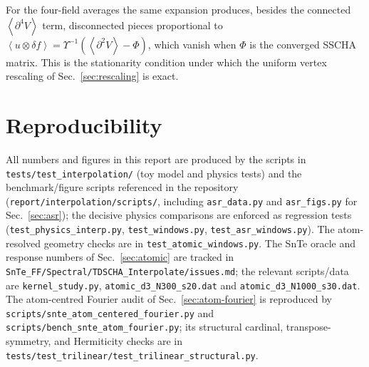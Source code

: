 \documentclass[11pt,a4paper]{article}
\newcommand{\avg}[1]{\left\langle #1 \right\rangle}
\begin{document}
For the four-field averages the same expansion produces, besides the
connected $\avg{\partial^4 V}$ term, disconnected pieces proportional to
$\avg{u \otimes \delta f} = \Upsilon^{-1}(\avg{\partial^2 V} - \Phi)$,
which vanish when $\Phi$ is the converged SSCHA matrix. This is the
stationarity condition under which the uniform vertex rescaling of
Sec.~\ref{sec:rescaling} is exact.

\section{Reproducibility}
All numbers and figures in this report are produced by the scripts in
\texttt{tests/test\_interpolation/} (toy model and physics tests) and the
benchmark/figure scripts referenced in the repository
(\texttt{report/interpolation/scripts/}, including \texttt{asr\_data.py}
and \texttt{asr\_figs.py} for Sec.~\ref{sec:asr}); the decisive physics
comparisons are enforced as regression tests
(\texttt{test\_physics\_interp.py}, \texttt{test\_windows.py},
\texttt{test\_asr\_windows.py}).  The atom-resolved geometry checks are in
\texttt{test\_atomic\_windows.py}.  The SnTe oracle and response numbers of
Sec.~\ref{sec:atomic} are tracked in
\texttt{SnTe\_FF/Spectral/TDSCHA\_Interpolate/issues.md}; the relevant
scripts/data are \texttt{kernel\_study.py},
\texttt{atomic\_d3\_N300\_s20.dat} and
\texttt{atomic\_d3\_N1000\_s30.dat}.
The atom-centred Fourier audit of Sec.~\ref{sec:atom-fourier} is reproduced
by \texttt{scripts/snte\_atom\_centered\_fourier.py} and
\texttt{scripts/bench\_snte\_atom\_fourier.py}; its structural cardinal,
transpose-symmetry, and Hermiticity checks are in
\texttt{tests/test\_trilinear/test\_trilinear\_structural.py}.
\end{document}
